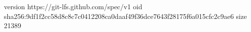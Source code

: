 version https://git-lfs.github.com/spec/v1
oid sha256:9df1f2cc58d8c8c7c0412208ca0daaf49f36dce7643f28175f6a015cfc2c9ae6
size 21389

